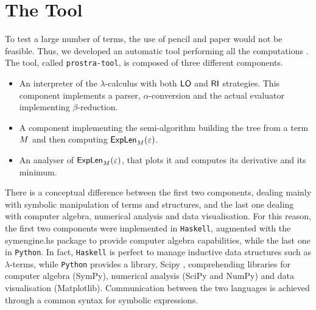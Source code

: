 \section{The Tool}
To test a large number of terms, the use of pencil and paper would not be feasible. Thus, we developed an automatic tool performing all the computations \cite{vanoni_prostra-tool_nodate}. The tool, called \texttt{prostra-tool}, is composed of three different components.
\begin{itemize}
	\item An interpreter of the $\lambda$-calculus with both $\textsf{LO}$ and $\textsf{RI}$ strategies. This component implements a parser, $\alpha$-conversion and the actual evaluator implementing $\beta$-reduction.
	\item A component implementing the semi-algorithm building the tree from a term $M$ and then computing $\textsf{ExpLen}_{M}(\varepsilon)$.
	\item An analyser of $\textsf{ExpLen}_{M}(\varepsilon)$, that plots it and computes its derivative and its minimum. 
\end{itemize}
There is a conceptual difference between the first two components, dealing mainly with symbolic manipulation of terms and structures, and the last one dealing with computer algebra, numerical analysis and data visualisation. For this reason, the first two components were implemented in \texttt{Haskell}, augmented with the \textsf{symengine.hs} package \cite{symengine} to provide computer algebra capabilities, while the last one in \texttt{Python}. In fact, \texttt{Haskell} is perfect to manage inductive data structures such as $\lambda$-terms, while \texttt{Python} provides a library, \textsf{Scipy} \cite{scipy}, comprehending libraries for computer algebra (\textsf{SymPy}), numerical analysis (\textsf{SciPy} and \textsf{NumPy}) and data visualisation (\textsf{Matplotlib}). Communication between the two languages is achieved through a common syntax for symbolic expressions.
